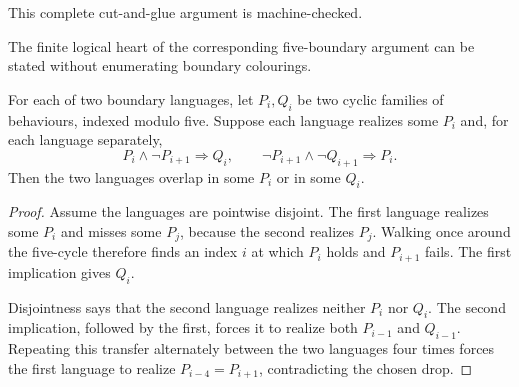 This complete cut-and-glue argument is machine-checked.

The finite logical heart of the corresponding five-boundary argument can be
stated without enumerating boundary colourings.

\begin{lemma}
\label{lem:abstract-birkhoff-five-cycle-propagation}
For each of two boundary languages, let $P_i,Q_i$ be two cyclic families of
behaviours, indexed modulo five.  Suppose each language realizes some $P_i$
and, for each language separately,
\[
 P_i\wedge\neg P_{i+1}\Longrightarrow Q_i,
 \qquad
 \neg P_{i+1}\wedge\neg Q_{i+1}\Longrightarrow P_i.
\]
Then the two languages overlap in some $P_i$ or in some $Q_i$.
\end{lemma}

\begin{proof}
Assume the languages are pointwise disjoint.  The first language realizes
some $P_i$ and misses some $P_j$, because the second realizes $P_j$.
Walking once around the five-cycle therefore finds an index $i$ at which
$P_i$ holds and $P_{i+1}$ fails.  The first implication gives $Q_i$.

Disjointness says that the second language realizes neither $P_i$ nor $Q_i$.
The second implication, followed by the first, forces it to realize both
$P_{i-1}$ and $Q_{i-1}$.  Repeating this transfer alternately between the two
languages four times forces the first language to realize $P_{i-4}=P_{i+1}$,
contradicting the chosen drop.
\end{proof}

